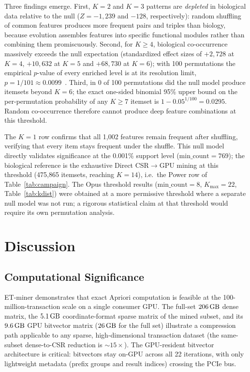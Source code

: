 \documentclass[10pt,a4paper,twocolumn]{article}
\begin{document}
Three findings emerge. First, $K{=}2$ and $K{=}3$ patterns are \emph{depleted} in biological data relative to the null ($Z{=}{-}1{,}239$ and ${-}128$, respectively): random shuffling of common features produces more frequent pairs and triples than biology, because evolution assembles features into specific functional modules rather than combining them promiscuously. Second, for $K{\geq}4$, biological co-occurrence massively exceeds the null expectation (standardized effect sizes of $+2{,}728$ at $K{=}4$, $+10{,}632$ at $K{=}5$ and $+68{,}730$ at $K{=}6$); with 100 permutations the empirical $p$-value of every enriched level is at its resolution limit, $p{=}1/101{\approx}0.0099$~\cite{phipson2010}. Third, in 0 of 100 permutations did the null model produce itemsets beyond $K{=}6$; the exact one-sided binomial 95\% upper bound on the per-permutation probability of any $K{\geq}7$ itemset is $1-0.05^{1/100}{=}0.0295$. Random co-occurrence therefore cannot produce deep feature combinations at this threshold.

The $K{=}1$ row confirms that all 1,002 features remain frequent after shuffling, verifying that every item stays frequent under the shuffle. This null model directly validates significance at the 0.001\% support level ($\text{min\_count}{=}769$); the biological reference is the exhaustive Direct CSR$\to$GPU mining at this threshold (475,865 itemsets, reaching $K{=}14$), i.e.\ the Power row of Table~\ref{tab:campaign}. The Opus threshold results ($\text{min\_count}{=}8$, $K_\text{max}{=}22$, Table~\ref{tab:kdist}) were obtained at a more permissive threshold where a separate null model was not run; a rigorous statistical claim at that threshold would require its own permutation analysis.

\section{Discussion}
\label{sec:discussion}

\subsection{Computational Significance}

ET-miner demonstrates that exact Apriori computation is feasible at the 100-million-transaction scale on a single consumer GPU. The full-set $206\text{\,GB}$ dense matrix, the $5.1\text{\,GB}$ coordinate-format sparse matrix of the mined subset, and its $9.6\text{\,GB}$ GPU bitvector matrix ($26\text{\,GB}$ for the full set) illustrate a compression path applicable to any sparse, high-dimensional transaction dataset (the same-subset dense-to-CSR reduction is ${\sim}15\times$). The GPU-resident bitvector architecture is critical: bitvectors stay on-GPU across all 22 iterations, with only lightweight metadata (prefix groups and result indices) crossing the PCIe bus.
\end{document}
